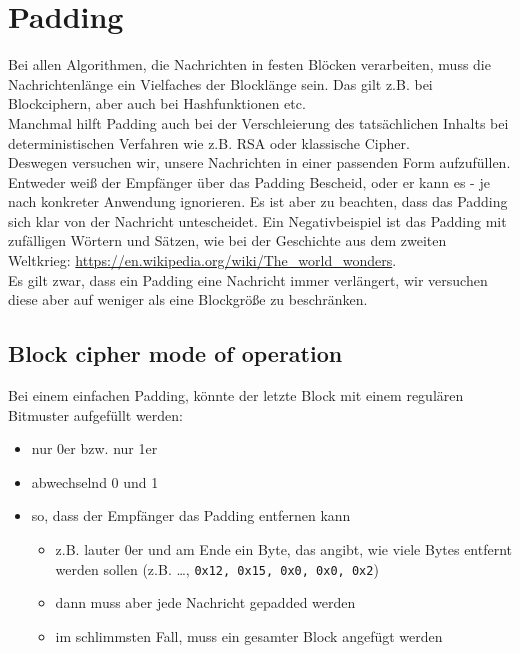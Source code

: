\chapter{Padding}

Bei allen Algorithmen, die Nachrichten in festen Blöcken verarbeiten, muss die Nachrichtenlänge
ein Vielfaches der Blocklänge sein. Das gilt z.B. bei Blockciphern, aber auch bei Hashfunktionen etc. \\

\noindent Manchmal hilft Padding auch bei der Verschleierung des tatsächlichen Inhalts bei deterministischen Verfahren wie z.B. RSA oder klassische Cipher. \\

\noindent Deswegen versuchen wir, unsere Nachrichten in einer passenden Form aufzufüllen. Entweder weiß der Empfänger über das Padding Bescheid, oder er kann es - je nach konkreter 
Anwendung ignorieren. Es ist aber zu beachten, dass das Padding sich klar von der Nachricht untescheidet. Ein Negativbeispiel ist das Padding mit zufälligen Wörtern und 
Sätzen, wie bei der Geschichte aus dem zweiten Weltkrieg: \url{https://en.wikipedia.org/wiki/The_world_wonders}. \\

\noindent Es gilt zwar, dass ein Padding eine Nachricht immer verlängert, wir versuchen diese aber auf weniger als eine Blockgröße zu beschränken.

\section{Block cipher mode of operation}

Bei einem einfachen Padding, könnte der letzte Block mit einem regulären Bitmuster aufgefüllt werden:

\begin{itemize}
    \item nur 0er bzw. nur 1er
    \item abwechselnd 0 und 1
    \item so, dass der Empfänger das Padding entfernen kann
    \begin{itemize}
        \item z.B. lauter 0er und am Ende ein Byte, das angibt, wie viele Bytes entfernt werden sollen (z.B. \ldots, \verb|0x12, 0x15, 0x0, 0x0, 0x2|)
        \item dann muss aber jede Nachricht gepadded werden
        \item im schlimmsten Fall, muss ein gesamter Block angefügt werden
    \end{itemize}
\end{itemize}

